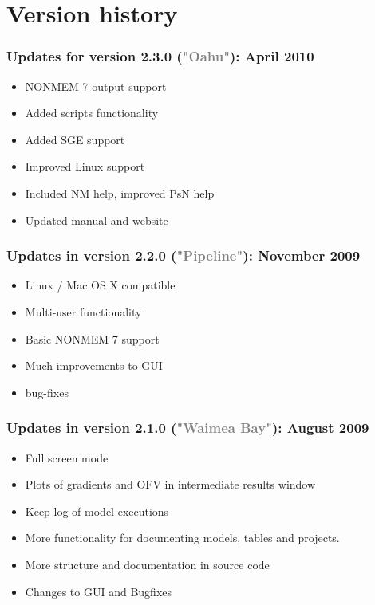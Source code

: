 \documentclass[a4,11pt]{report} \usepackage[pdftex]{graphicx}
\begin{document}
{{{\section{Version history}
\subsubsection*{Updates for version 2.3.0 (\textcolor{Grey}{"Oahu"}):
April 2010}
\begin{itemize} \scriptsize
  \item NONMEM 7 output support
  \item Added scripts functionality
  \item Added SGE support
  \item Improved Linux support
  \item Included NM help, improved PsN help
  \item Updated manual and website
\end{itemize}

\subsubsection*{Updates in version 2.2.0
(\textcolor{Grey}{"Pipeline"}): November 2009}
\begin{itemize} \scriptsize
  \item Linux / Mac OS X compatible
  \item Multi-user functionality
  \item Basic NONMEM 7 support
  \item Much improvements to GUI
  \item bug-fixes
\end{itemize}

\subsubsection*{Updates in version 2.1.0 (\textcolor{Grey}{"Waimea
Bay"}): August 2009}
\begin{itemize} \scriptsize
  \item Full screen mode
  \item Plots of gradients and OFV in intermediate results window
  \item Keep log of model executions
  \item More functionality for documenting models, tables and
projects.
  \item More structure and documentation in source code
  \item Changes to GUI and Bugfixes
\end{itemize}

}}}
\end{document}
